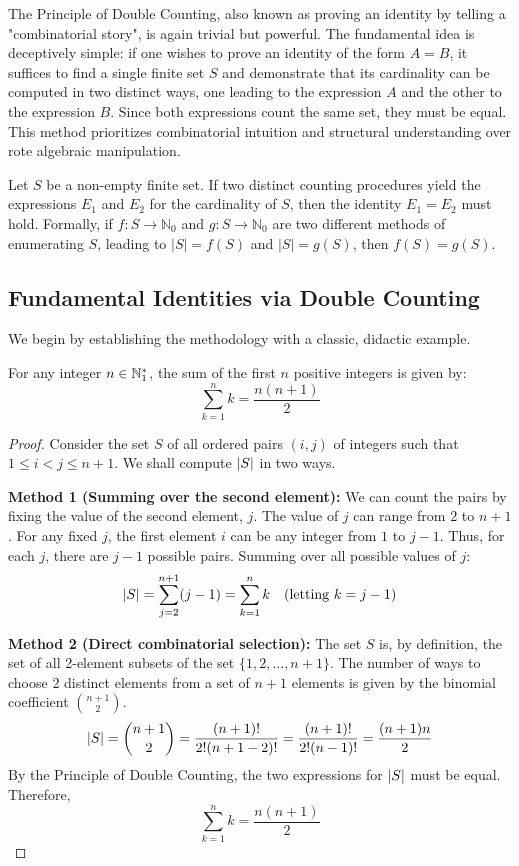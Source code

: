 The Principle of Double Counting, also known as proving an identity by telling a "combinatorial story", is again trivial but powerful. The fundamental idea is deceptively simple: if one wishes to prove an identity of the form $A=B$, it suffices to find a single finite set $S$ and demonstrate that its cardinality can be computed in two distinct ways, one leading to the expression $A$ and the other to the expression $B$. Since both expressions count the same set, they must be equal. This method prioritizes combinatorial intuition and structural understanding over rote algebraic manipulation.

\begin{theorem}
Let $S$ be a non-empty finite set. If two distinct counting procedures yield the expressions $E_1$ and $E_2$ for the cardinality of $S$, then the identity $E_1 = E_2$ must hold. Formally, if $f: S \to \mathbb{N}_0$ and $g: S \to \mathbb{N}_0$ are two different methods of enumerating $S$, leading to $|S| = f(S)$ and $|S| = g(S)$, then $f(S) = g(S)$.
\end{theorem}

\subsection{Fundamental Identities via Double Counting}

We begin by establishing the methodology with a classic, didactic example.

\begin{proposition}
For any integer $n \in \mathbb{N}_{1}^*$, the sum of the first $n$ positive integers is given by:
$$ \sum_{k=1}^{n} k = \frac{n(n+1)}{2} $$
\end{proposition}
\begin{proof}
Consider the set $S$ of all ordered pairs $(i, j)$ of integers such that $1 \le i < j \le n+1$. We shall compute $\left| S \right|$ in two ways.

\textbf{Method 1 (Summing over the second element):} We can count the pairs by fixing the value of the second element, $j$. The value of $j$ can range from $2$ to $n+1$. For any fixed $j$, the first element $i$ can be any integer from $1$ to $j-1$. Thus, for each $j$, there are $j-1$ possible pairs. Summing over all possible values of $j$:
$$ \left| S \right| = \sum_{j=2}^{n+1} (j-1) = \sum_{k=1}^{n} k \quad (\text{letting } k=j-1) $$

\textbf{Method 2 (Direct combinatorial selection):} The set $S$ is, by definition, the set of all 2-element subsets of the set $\{1, 2, \dots, n+1\}$. The number of ways to choose 2 distinct elements from a set of $n+1$ elements is given by the binomial coefficient $\binom{n+1}{2}$.
$$ \left| S \right| = \binom{n+1}{2} = \frac{(n+1)!}{2!(n+1-2)!} = \frac{(n+1)!}{2!(n-1)!} = \frac{(n+1)n}{2} $$
By the Principle of Double Counting, the two expressions for $\left| S \right|$ must be equal. Therefore,
$$ \sum_{k=1}^{n} k = \frac{n(n+1)}{2} $$
\end{proof}

